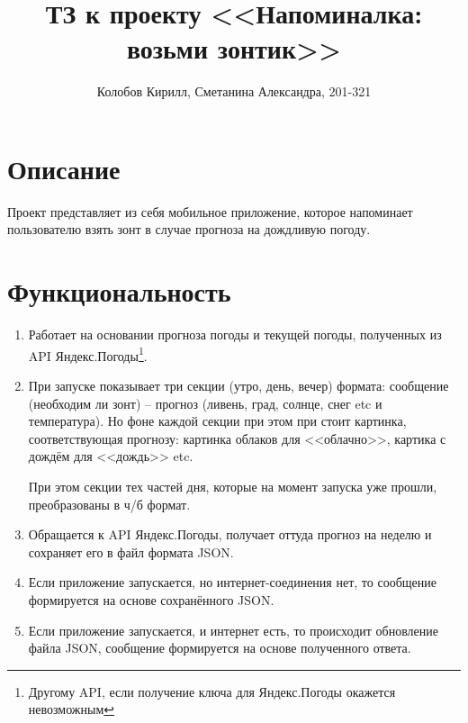 \documentclass[a4paper,12pt]{report}
\author{Колобов Кирилл, Сметанина Александра, 201-321}
\title{ТЗ к проекту <<Напоминалка: возьми зонтик>>}
\begin{document}
\maketitle

\tableofcontents
\newpage

\section{Описание}
Проект представляет из себя мобильное приложение, которое напоминает пользователю 
взять зонт в случае прогноза на дождливую погоду.

\section{Функциональность}
\begin{enumerate}
\item{Работает на основании прогноза погоды и текущей погоды, полученных из API Яндекс.Погоды\footnote{
      Другому API, если получение ключа для Яндекс.Погоды окажется невозможным}.}
\item{При запуске показывает три секции (утро, день, вечер) формата: 
      сообщение (необходим ли зонт) -- прогноз (ливень, град, солнце, снег etc и температура).
      Но фоне каждой секции при этом при стоит картинка, соответствующая 
      прогнозу: картинка облаков для <<облачно>>, картика с дождём для <<дождь>> etc.

      При этом секции тех частей дня, которые на момент запуска 
      уже прошли, преобразованы в ч/б формат.}
\item{Обращается к API Яндекс.Погоды, 
      получает оттуда прогноз на неделю и сохраняет его в файл формата JSON.}
\item{Если приложение запускается, но интернет-соединения нет, 
      то сообщение формируется на основе сохранённого JSON.}
\item{Если приложение запускается, и интернет есть, то происходит 
      обновление файла JSON, сообщение формируется на основе полученного ответа.}
\end{enumerate}
\end{document}
